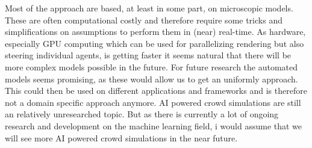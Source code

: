 \documentclass{acmsiggraph}               %
\begin{document}
Most of the approach are based, at least in some part, on microscopic models. These are often computational costly and therefore require some tricks and simplifications on assumptions to perform them in (near) real-time. As hardware, especially GPU computing which can be used for parallelizing rendering but also steering individual agents, is getting faster it seems natural that there will be more complex models possible in the future.
For future research the automated models seems promising, as these would allow us to get an uniformly approach. This could then be used on different applications and frameworks and is therefore not a domain specific approach anymore. 
AI powered crowd simulations are still an relatively unresearched topic. But as there is currently a lot of ongoing research and development on the machine learning field, i would assume that we will see more AI powered crowd simulations in the near future.   


\nocite{*}

\end{document}
